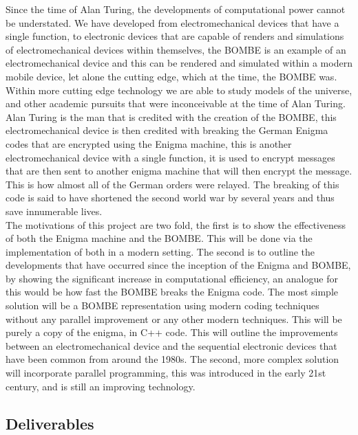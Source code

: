 \documentclass[12pt,a4paper]{article}
\begin{document}
Since the time of Alan Turing, the developments of computational power cannot be understated. We have developed from electromechanical devices that have a single function, to electronic devices that are capable of renders and simulations of electromechanical devices within themselves, the BOMBE is an example of an electromechanical device and this can be rendered and simulated within a modern mobile device, let alone the cutting edge, which at the time, the BOMBE was. Within more cutting edge technology we are able to study models of the universe, and other academic pursuits that were inconceivable at the time of Alan Turing.\\

Alan Turing is the man that is credited with the creation of the BOMBE, this electromechanical device is then credited with breaking the German Enigma codes that are encrypted using the Enigma machine, this is another electromechanical device with a single function, it is used to encrypt messages that are then sent to another enigma machine that will then encrypt the message. This is how almost all of the German orders were relayed. The breaking of this code is said to have shortened the second world war by several years and thus save innumerable lives.\\

The motivations of this project are two fold, the first is to show the effectiveness of both the Enigma machine and the BOMBE. This will be done via the implementation of both in a modern setting. The second is to outline the developments that have occurred since the inception of the Enigma and BOMBE, by showing the significant increase in computational efficiency, an analogue for this would be how fast the BOMBE breaks the Enigma code. The most simple solution will be a BOMBE representation using modern coding techniques without any parallel improvement or any other modern techniques. This will be purely a copy of the enigma, in C++ code. This will outline the improvements between an electromechanical device and the sequential electronic devices that have been common from around the 1980s. The second, more complex solution will incorporate parallel programming, this was introduced in the early 21st century, and is still an improving technology.\\

\subsection{Deliverables}
\end{document}

